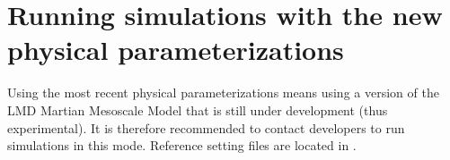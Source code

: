 




\mk
\section{Running simulations with the new physical parameterizations}

\sk
Using the most recent physical parameterizations means using a version of the LMD Martian Mesoscale Model that is still under development (thus experimental). It is therefore recommended to contact developers to run simulations in this mode. Reference setting files are located in .

